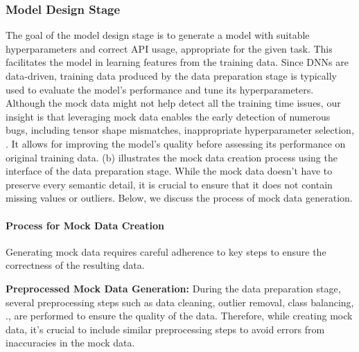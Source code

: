 \subsubsection{Model Design Stage}
The goal of the model design stage is to generate a model with suitable hyperparameters and correct API usage,
appropriate for the given task. This facilitates the model in learning features from the training data. 
Since DNNs are data-driven, training data produced by the data preparation stage is typically used to evaluate the model's performance and tune its hyperparameters. 
Although the mock data might not help detect all the training time issues,
our insight is that leveraging mock data enables the early detection of numerous bugs, including tensor shape mismatches, inappropriate hyperparameter selection, \etc. It allows for improving the model's quality before assessing its performance on original training data.
(b) illustrates the mock data creation process using the interface of the data preparation stage.
While the mock data doesn’t have to preserve every semantic detail, it is crucial to ensure that it does not contain missing values or outliers.
Below, we discuss the process of mock data generation.


\paragraph{Process for Mock Data Creation}
Generating mock data requires careful adherence to key steps to ensure the correctness of the resulting data.

\textbf{Preprocessed Mock Data Generation:}
During the data preparation stage, several preprocessing steps such as data cleaning, outlier removal, class balancing, \etc., are performed to ensure the quality of the data.
Therefore, while creating mock data, it's crucial to include similar preprocessing steps to avoid errors from inaccuracies in the mock data.

